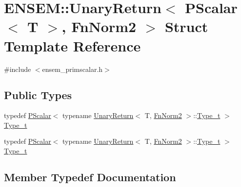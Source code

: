 \hypertarget{structENSEM_1_1UnaryReturn_3_01PScalar_3_01T_01_4_00_01FnNorm2_01_4}{}\section{E\+N\+S\+EM\+:\+:Unary\+Return$<$ P\+Scalar$<$ T $>$, Fn\+Norm2 $>$ Struct Template Reference}
\label{structENSEM_1_1UnaryReturn_3_01PScalar_3_01T_01_4_00_01FnNorm2_01_4}


{\ttfamily \#include $<$ensem\+\_\+primscalar.\+h$>$}

\subsection*{Public Types}
\begin{DoxyCompactItemize}
\item 
typedef \mbox{\hyperlink{classENSEM_1_1PScalar}{P\+Scalar}}$<$ typename \mbox{\hyperlink{structENSEM_1_1UnaryReturn}{Unary\+Return}}$<$ T, \mbox{\hyperlink{structENSEM_1_1FnNorm2}{Fn\+Norm2}} $>$\+::\mbox{\hyperlink{structENSEM_1_1UnaryReturn_3_01PScalar_3_01T_01_4_00_01FnNorm2_01_4_a668c493a2fae41d6416ca55cc046b6b5}{Type\+\_\+t}} $>$ \mbox{\hyperlink{structENSEM_1_1UnaryReturn_3_01PScalar_3_01T_01_4_00_01FnNorm2_01_4_a668c493a2fae41d6416ca55cc046b6b5}{Type\+\_\+t}}
\item 
typedef \mbox{\hyperlink{classENSEM_1_1PScalar}{P\+Scalar}}$<$ typename \mbox{\hyperlink{structENSEM_1_1UnaryReturn}{Unary\+Return}}$<$ T, \mbox{\hyperlink{structENSEM_1_1FnNorm2}{Fn\+Norm2}} $>$\+::\mbox{\hyperlink{structENSEM_1_1UnaryReturn_3_01PScalar_3_01T_01_4_00_01FnNorm2_01_4_a668c493a2fae41d6416ca55cc046b6b5}{Type\+\_\+t}} $>$ \mbox{\hyperlink{structENSEM_1_1UnaryReturn_3_01PScalar_3_01T_01_4_00_01FnNorm2_01_4_a668c493a2fae41d6416ca55cc046b6b5}{Type\+\_\+t}}
\end{DoxyCompactItemize}


\subsection{Member Typedef Documentation}
\mbox{\label{structENSEM_1_1UnaryReturn_3_01PScalar_3_01T_01_4_00_01FnNorm2_01_4_a668c493a2fae41d6416ca55cc046b6b5}} 
